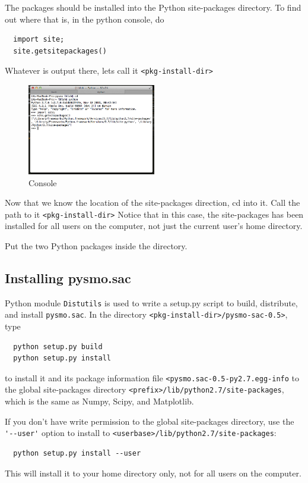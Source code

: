 \documentclass[letterpaper,10pt]{article}
\begin{document}
The packages should be installed into the Python site-packages directory. To find out where that is, in the python console, do

\begin{verbatim}
  import site;
  site.getsitepackages()
\end{verbatim}

Whatever is output there, lets call it \verb"<pkg-install-dir>"

\begin{figure}[h!]
  \centering
  \includegraphics[width=0.5\textwidth]{images/site_package_location}
  \caption{Console}
  \label{fig:site_package_location}
\end{figure}

Now that we know the location of the site-packages direction, cd into it. Call the path to it \verb"<pkg-install-dir>" Notice that in this case, the site-packages has been installed for all users on the computer, not just the current user's home directory. 

Put the two Python packages inside the directory.

\subsection{Installing pysmo.sac}

Python module \verb"Distutils" is used to write a setup.py script to build, distribute, and install \verb"pysmo.sac". In the directory \verb"<pkg-install-dir>/pysmo-sac-0.5>", type 

\begin{verbatim}
  python setup.py build
  python setup.py install
\end{verbatim}

to install it and its package information file \verb"<pysmo.sac-0.5-py2.7.egg-info" to the global site-packages directory \verb"<prefix>/lib/python2.7/site-packages", which is the same as Numpy, Scipy, and Matplotlib.

If you don't have write permission to the global site-packages directory, use the \verb"'--user'" option to install to \verb"<userbase>/lib/python2.7/site-packages":

\begin{verbatim}
  python setup.py install --user
\end{verbatim}

This will install it to your home directory only, not for all users on the computer. 


















\end{document}
